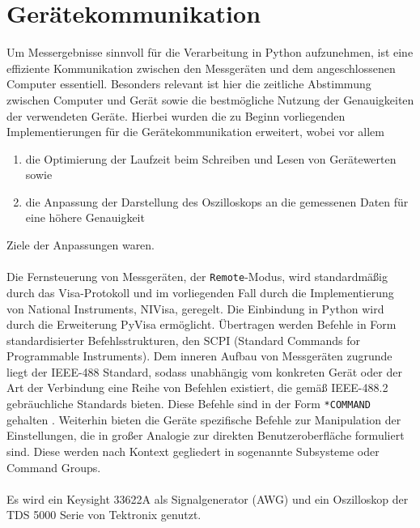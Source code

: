 \documentclass[../Report.tex]{subfiles}
\begin{document}
\section{Gerätekommunikation}
\label{sec:vorg.geraete}

Um Messergebnisse sinnvoll für die Verarbeitung in Python aufzunehmen, ist eine effiziente Kommunikation zwischen den Messgeräten und dem angeschlossenen Computer essentiell. Besonders relevant ist hier die zeitliche Abstimmung zwischen Computer und Gerät sowie die bestmögliche Nutzung der Genauigkeiten der verwendeten Geräte. 
Hierbei wurden die zu Beginn vorliegenden Implementierungen für die Gerätekommunikation erweitert, wobei vor allem
\begin{enumerate}
	\item die Optimierung der Laufzeit beim Schreiben und Lesen von Gerätewerten sowie
	\item die Anpassung der Darstellung des Oszilloskops an die gemessenen Daten für eine höhere Genauigkeit
\end{enumerate}
Ziele der Anpassungen waren.
\\
\\
Die Fernsteuerung von Messgeräten, der \lstinline{Remote}-Modus, wird standardmäßig durch das Visa-Protokoll und im vorliegenden Fall durch die Implementierung von National Instruments, NIVisa, geregelt. Die Einbindung in Python wird durch die Erweiterung PyVisa ermöglicht. Übertragen werden Befehle in Form standardisierter Befehlsstrukturen, den SCPI (Standard Commands for Programmable Instruments). Dem inneren Aufbau von Messgeräten zugrunde liegt der IEEE-488 Standard, sodass unabhängig vom konkreten Gerät oder der Art der Verbindung eine Reihe von Befehlen existiert, die gemäß IEEE-488.2 gebräuchliche Standards bieten. Diese Befehle sind in der Form \lstinline{*COMMAND} gehalten \cite[S. 224 ff.]{keysHand15}. 
Weiterhin bieten die Geräte spezifische Befehle zur Manipulation der Einstellungen, die in großer Analogie zur direkten Benutzeroberfläche formuliert sind. Diese werden nach Kontext gegliedert in sogenannte Subsysteme oder Command Groups.
\\
\\
\noindent
Es wird ein Keysight 33622A als Signalgenerator (AWG) und ein Oszilloskop der TDS 5000 Serie von Tektronix genutzt.
\end{document}
